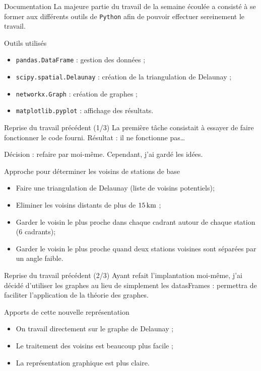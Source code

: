 {
\smallframetitle
\begin{frame}{Documentation}
    La majeure partie du travail de la semaine écoulée a consisté à se former aux différents outils de \texttt{Python} afin de pouvoir effectuer sereinement le travail.

    \begin{block}{Outils utilisés}
        \begin{itemize}
            \item \texttt{pandas.DataFrame} : gestion des données ;
            \item \texttt{scipy.spatial.Delaunay} : création de la triangulation de Delaunay ;
            \item \texttt{networkx.Graph} : création de graphes ;
            \item \texttt{matplotlib.pyplot} : affichage des résultats.
        \end{itemize}
    \end{block}
\end{frame}

\begin{frame}{Reprise du travail précédent (1/3)}
    La première tâche consistait à essayer de faire fonctionner le code fourni. Résultat : il ne fonctionne pas\dots
    
    Décision : refaire par moi-même. Cependant, j'ai gardé les idées.
    \begin{block}{Approche pour déterminer les voisins de stations de base}
        \begin{itemize}
            \item Faire une triangulation de Delaunay (liste de voisins potentiels);
            \item Eliminer les voisins distants de plus de $\unit[15]{km}$ ;
            \item Garder le voisin le plus proche dans chaque cadrant autour de chaque station (6 cadrants);
            \item Garder le voisin le plus proche quand deux stations voisines sont séparées par un angle faible.
        \end{itemize}
            
    \end{block}
\end{frame}

\begin{frame}{Reprise du travail précédent (2/3)}
    Ayant refait l'implantation moi-même, j'ai décidé d'utiliser les graphes au lieu de simplement les datasFrames : permettra de faciliter l'application de la théorie des graphes.
    \begin{block}{Apports de cette nouvelle représentation}
        \begin{itemize}
            \item On travail directement sur le graphe de Delaunay ;
            \item Le traitement des voisins est beaucoup plus facile ;
            \item La représentation graphique est plus claire.
        \end{itemize}
    \end{block}
\end{frame}

}
